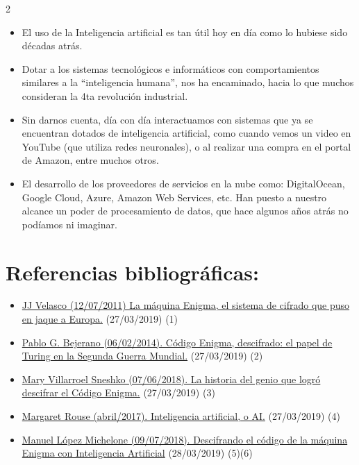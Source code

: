 \documentclass[12pt,spanish,Letterpaper,openany]{book}
\begin{document}
\begin {multicols}{2}
\begin{itemize}
\item
  El uso de la Inteligencia artificial es tan útil hoy en día como lo hubiese sido décadas atrás.
\item
  Dotar a los sistemas tecnológicos e informáticos con comportamientos similares a la ``inteligencia humana'', nos ha encaminado, hacia lo que muchos consideran la 4ta revolución industrial.
\item
  Sin darnos cuenta, día con día interactuamos con sistemas que ya se encuentran dotados de inteligencia artificial, como cuando vemos un video en YouTube (que utiliza redes neuronales), o al realizar una compra en el portal de Amazon, entre muchos otros.
\item
  El desarrollo de los proveedores de servicios en la nube como: DigitalOcean, Google Cloud, Azure, Amazon Web Services, etc. Han puesto a nuestro alcance un poder de procesamiento de datos, que hace algunos años atrás no podíamos ni imaginar.
\end{itemize}

\hypertarget{referencias-bibliograficas-5}{%
\section{Referencias bibliográficas:}\label{referencias-bibliograficas-5}}

\begin{itemize}
\item
  \href{https://hipertextual.com/2011/07/la-maquina-enigma-el-sistema-de-cifrado-que-puso-en-jaque-a-europa}{JJ Velasco (12/07/2011) La máquina Enigma, el sistema de cifrado que puso en jaque a Europa.} (27/03/2019) (1)
\item
  \href{https://www.eldiario.es/turing/criptografia/alan-turing-enigma-codigo_0_226078042.html}{Pablo G. Bejerano (06/02/2014). Código Enigma, descifrado: el papel de Turing en la Segunda Guerra Mundial.} (27/03/2019) (2)
\item
  \href{https://culturizando.com/la-historia-del-genio-logro-descifrar-codigo-enigma/}{Mary Villarroel Sneshko (07/06/2018). La historia del genio que logró descifrar el Código Enigma.} (27/03/2019) (3)
\item
  \href{https://searchdatacenter.techtarget.com/es/definicion/Inteligencia-artificial-o-AI}{Margaret Rouse (abril/2017). Inteligencia artificial, o AI.} (27/03/2019) (4)
\item
  \href{https://www.unocero.com/ciencia/descifrando-el-codigo-de-la-maquina-enigma-con-inteligencia-artificial/el-codigo-de-la-maquina-enigma-con-inteligencia-artificial/}{Manuel López Michelone (09/07/2018). Descifrando el código de la máquina Enigma con Inteligencia Artificial} (28/03/2019) (5)(6)
\end{itemize}

\end {multicols}
\end{document}
